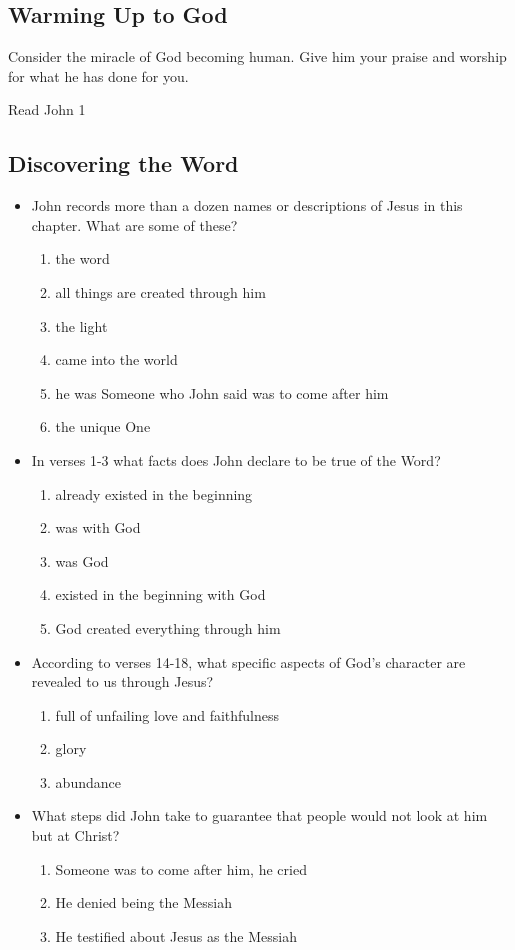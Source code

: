 \documentclass[11pt]{article}
\begin{document}
\subsection{Warming Up to God}
\label{sec:org72f7ea9}

Consider the miracle of God becoming human. Give him your praise and worship for what he has done for you.

Read John 1

\subsection{Discovering the Word}
\label{sec:org47065e3}

\begin{itemize}
\item John records more than a dozen names or descriptions of Jesus in this chapter. What are some of these?
\begin{enumerate}
\item the word
\item all things are created through him
\item the light
\item came into the world
\item he was Someone who John said was to come after him
\item the unique One
\end{enumerate}
\item In verses 1-3 what facts does John declare to be true of the Word?
\begin{enumerate}
\item already existed in the beginning
\item was with God
\item was God
\item existed in the beginning with God
\item God created everything through him
\end{enumerate}
\item According to verses 14-18, what specific aspects of God's character are revealed to us through Jesus?
\begin{enumerate}
\item full of unfailing love and faithfulness
\item glory
\item abundance
\end{enumerate}

\item What steps did John take to guarantee that people would not look at him but at Christ?
\begin{enumerate}
\item Someone was to come after him, he cried
\item He denied being the Messiah
\item He testified about Jesus as the Messiah
\end{enumerate}


\end{itemize}
\end{document}

